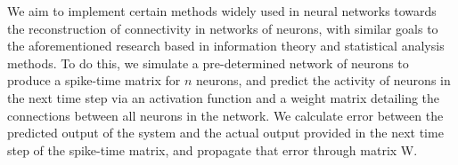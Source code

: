 \documentclass{article}
\newcommand\tab[1][1cm]{\hspace*{#1}}
\begin{document}
\tab We aim to implement certain methods widely used in neural networks towards the reconstruction of connectivity in networks of neurons, with similar goals to the aforementioned research based in information theory and statistical analysis methods. To do this, we simulate a pre-determined network of neurons to produce a spike-time matrix for $n$ neurons, and predict the activity of neurons in the next time step via an activation function and a weight matrix detailing the connections between all neurons in the network. We calculate error between the predicted output of the system and the actual output provided in the next time step of the spike-time matrix, and propagate that error through matrix W.\par
\end{document}
